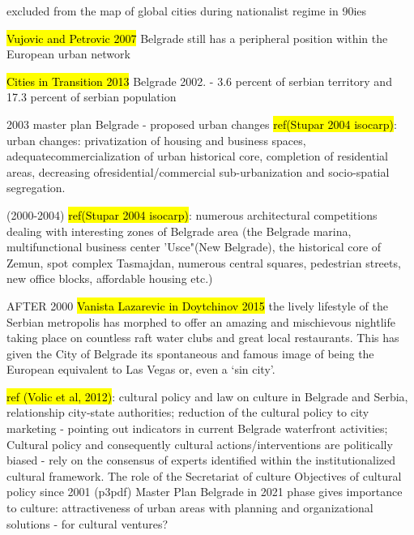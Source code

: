 \documentclass[11pt]{report}
\begin{document}
excluded from the map of global cities during nationalist regime in 90ies

\hl{Vujovic and Petrovic 2007}
Belgrade still has a peripheral position within the European urban network

\hl{Cities in Transition 2013}
Belgrade 2002. - 3.6 percent of serbian territory and 17.3 percent of serbian population

2003 master plan Belgrade - proposed urban changes \hl{ref(Stupar 2004 isocarp)}:
urban changes:
privatization  of  housing  and  business  spaces, 
adequatecommercialization  of  urban  historical core,
completion  of  residential  areas,
decreasing  ofresidential/commercial  sub-urbanization  and  socio-spatial  segregation. 

(2000-2004) \hl{ref(Stupar 2004 isocarp)}:
numerous  architectural  competitions  dealing  with interesting  zones  of  Belgrade  area (the Belgrade marina, multifunctional business center 'Usce"(New Belgrade), the historical core of Zemun, spot complex Tasmajdan, numerous central squares, pedestrian streets, new office blocks, affordable housing etc.)

AFTER 2000
	\hl{Vanista Lazarevic in Doytchinov 2015}
the  lively  lifestyle  of  the  Serbian  metropolis  has  morphed  to  offer  an amazing and mischievous nightlife taking place on countless raft water clubs and great local restaurants. This has given the City of Belgrade its spontaneous and famous image of being the European equivalent to Las Vegas or, even a ‘sin  city’.

\hl{ref (Volic et al, 2012)}:
cultural policy and law on culture in Belgrade and Serbia, relationship city-state authorities; reduction of the cultural policy to city marketing - pointing out indicators in current Belgrade waterfront activities;
Cultural policy and consequently cultural actions/interventions are  politically biased - rely on the consensus of experts identified within the institutionalized cultural framework.
The role of the Secretariat of culture
Objectives of cultural policy since 2001 (p3pdf) 
Master Plan Belgrade in 2021 phase gives importance to culture: attractiveness of urban areas with planning and organizational solutions - for cultural ventures?
\end{document}
